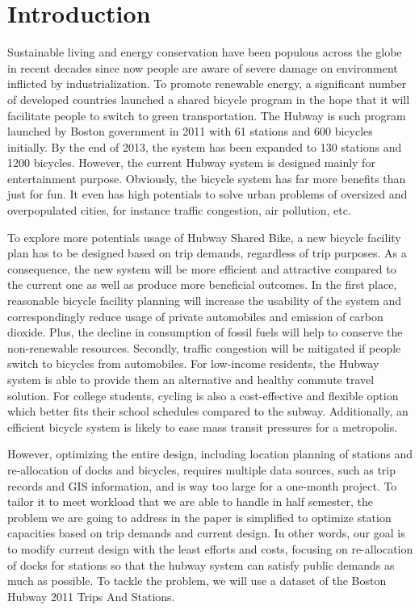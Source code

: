 \documentclass[journal, letterpaper]{IEEEtran}
\begin{document}
\section{Introduction}
\large
Sustainable living and energy conservation have been populous across the globe in recent decades since now people are aware of severe damage on environment inflicted by industrialization. To promote renewable energy, a significant number of developed countries launched a shared bicycle program in the hope that it will facilitate people to switch to green transportation. The Hubway is such program launched by Boston government in 2011 with 61 stations and 600 bicycles initially. By the end of 2013, the system has been expanded to 130 stations and 1200 bicycles. However, the current Hubway system is designed mainly for entertainment purpose. Obviously, the bicycle system has far more benefits than just for fun. It even has high potentials to solve urban problems of oversized and overpopulated cities, for instance traffic congestion, air pollution, etc. 

To explore more potentials usage of Hubway Shared Bike, a new bicycle facility plan has to be designed based on trip demands, regardless of trip purposes. As a consequence, the new system will be more efficient and attractive compared to the current one as well as produce more beneficial outcomes. In the first place, reasonable bicycle facility planning will increase the usability of the system and correspondingly reduce usage of private automobiles and emission of carbon dioxide. Plus, the decline in consumption of fossil fuels will help to conserve the non-renewable resources. Secondly, traffic congestion will be mitigated if people switch to bicycles from automobiles. For low-income residents, the Hubway system is able to provide them an alternative and healthy commute travel solution. For college students, cycling is also a cost-effective and flexible option which better fits their school schedules compared to the subway. Additionally, an efficient bicycle system is likely to ease mass transit pressures for a metropolis.   

However, optimizing the entire design, including location planning of stations and re-allocation of docks and bicycles, requires multiple data sources, such as trip records and GIS information, and is way too large for a one-month project. To tailor it to meet workload that we are able to handle in half semester, the problem we are going to address in the paper is simplified to optimize station capacities based on trip demands and current design. In other words, our goal is to modify current design with the least efforts and costs, focusing on re-allocation of docks for stations so that the hubway system can satisfy public demands as much as possible. To tackle the problem, we will use a dataset of the Boston Hubway 2011 Trips And Stations.  
\end{document}
